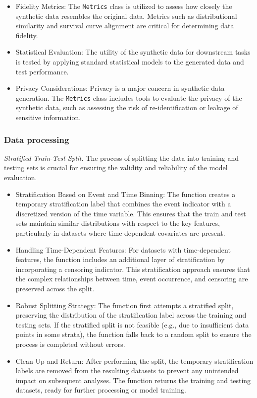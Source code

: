 \begin{itemize}
    \item Fidelity Metrics: The \texttt{Metrics} class is utilized to assess how closely the synthetic data resembles the original data. Metrics such as distributional similarity and survival curve alignment are critical for determining data fidelity. 
    \item Statistical Evaluation: The utility of the synthetic data for downstream tasks is tested by applying standard statistical models to the generated data and test performance. 
    \item Privacy Considerations: Privacy is a major concern in synthetic data generation. The \texttt{Metrics} class includes tools to evaluate the privacy of the synthetic data, such as assessing the risk of re-identification or leakage of sensitive information. 
\end{itemize}
\subsubsection*{Data processing}
\noindent \textit{Stratified Train-Test Split.} The process of splitting the data into training and testing sets is crucial for ensuring the validity and reliability of the model evaluation. 
\begin{itemize}
    \item Stratification Based on Event and Time Binning: The function creates a temporary stratification label that combines the event indicator with a discretized version of the time variable. This ensures that the train and test sets maintain similar distributions with respect to the key features, particularly in datasets where time-dependent covariates are present.
    \item Handling Time-Dependent Features: For datasets with time-dependent features, the function includes an additional layer of stratification by incorporating a censoring indicator. This stratification approach ensures that the complex relationships between time, event occurrence, and censoring are preserved across the split.
    \item Robust Splitting Strategy: The function first attempts a stratified split, preserving the distribution of the stratification label across the training and testing sets. If the stratified split is not feasible (e.g., due to insufficient data points in some strata), the function falls back to a random split to ensure the process is completed without errors.
    \item Clean-Up and Return: After performing the split, the temporary stratification labels are removed from the resulting datasets to prevent any unintended impact on subsequent analyses. The function returns the training and testing datasets, ready for further processing or model training.
\end{itemize}



